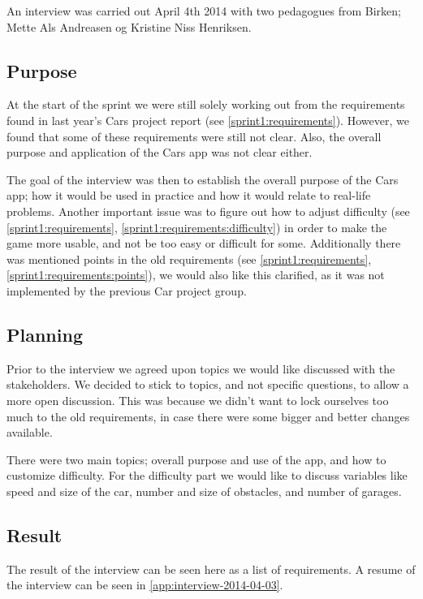 An interview was carried out April 4th 2014 with two pedagogues from Birken; Mette Als Andreasen og Kristine Niss Henriksen.

\subsection{Purpose}
At the start of the sprint we were still solely working out from the requirements found in last year's Cars project report (see \cref{sprint1:requirements}).
However, we found that some of these requirements were still not clear.
Also, the overall purpose and application of the Cars app was not clear either.

The goal of the interview was then to establish the overall purpose of the Cars app; how it would be used in practice and how it would relate to real-life problems.
Another important issue was to figure out how to adjust difficulty (see \cref{sprint1:requirements}, \cref{sprint1:requirements:difficulty}) in order to make the game more usable, and not be too easy or difficult for some.
Additionally there was mentioned points in the old requirements (see \cref{sprint1:requirements}, \cref{sprint1:requirements:points}), we would also like this clarified, as it was not implemented by the previous Car project group.

\subsection{Planning}
Prior to the interview we agreed upon topics we would like discussed with the stakeholders.
We decided to stick to topics, and not specific questions, to allow a more open discussion.
This was because we didn't want to lock ourselves too much to the old requirements, in case there were some bigger and better changes available.

There were two main topics; overall purpose and use of the app, and how to customize difficulty.
For the difficulty part we would like to discuss variables like speed and size of the car, number and size of obstacles, and number of garages.

\subsection{Result}
The result of the interview can be seen here as a list of requirements.
A resume of the interview can be seen in \cref{app:interview-2014-04-03}.

